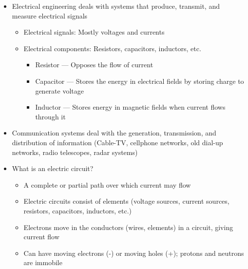 \begin{itemize}

  \item Electrical engineering deals with systems that produce, transmit, and measure electrical signals

    \begin{itemize}

      \item Electrical signals: Mostly voltages and currents

      \item Electrical components: Resistors, capacitors, inductors, etc.

        \begin{itemize}

          \item Resistor — Opposes the flow of current

          \item Capacitor — Stores the energy in electrical fields by storing charge to generate voltage

          \item Inductor — Stores energy in magnetic fields when current flows through it

        \end{itemize}

    \end{itemize}

  \item Communication systems deal with the generation, transmission, and distribution of information (Cable-TV, cellphone networks, old dial-up networks, radio telescopes, radar systems)

  \item What is an electric circuit?

    \begin{itemize}

      \item A complete or partial path over which current may flow

      \item Electric circuits consist of elements (voltage sources, current sources, resistors, capacitors, inductors, etc.)

      \item Electrons move in the conductors (wires, elements) in a circuit, giving current flow

      \item Can have moving electrons (-) or moving holes (+); protons and neutrons are immobile


\end{itemize}
\end{itemize}
